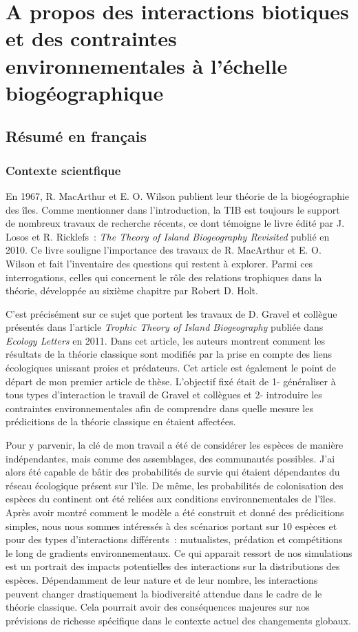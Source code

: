 \chapter{A propos des interactions biotiques et des contraintes environnementales à l'échelle biogéographique}


\section{Résumé en français}
%
\subsection{Contexte scientfique}

En 1967, R. MacArthur et E. O. Wilson publient leur théorie de la
biogéographie des îles. Comme mentionner dans l'introduction, la TIB est toujours le support de nombreux travaux de recherche récents,
ce dont témoigne le livre édité par J. Losos et R. Ricklefs~: \emph{The Theory of Island Biogeography Revisited} publié en 2010.
Ce livre souligne l'importance des travaux de R. MacArthur et E. O. Wilson et fait l'inventaire des questions qui restent à explorer.
Parmi ces interrogations, celles qui concernent le rôle des relations trophiques dans la théorie, développée au sixième chapitre par Robert D. Holt.

C'est précisément sur ce sujet que portent les travaux de D. Gravel et collègue présentés dans l'article \emph{Trophic Theory of Island Biogeography} publiée dans \emph{Ecology Letters} en 2011.
Dans cet article, les auteurs montrent comment les résultats de la théorie classique sont modifiés par la prise en compte des liens écologiques unissant proies et prédateurs.
Cet article est également le point de départ de mon premier article de thèse. L'objectif fixé était de 1- généraliser à tous types d'interaction le travail de Gravel et collègues
et 2- introduire les contraintes environnementales afin de comprendre dans quelle mesure les prédicitions de la théorie classique en étaient affectées.

Pour y parvenir, la clé de mon travail a été de considérer les espèces de manière indépendantes, mais comme des assemblages, des communautés possibles.
J'ai alors été capable de bâtir des probabilités de survie qui étaient dépendantes du réseau écologique présent sur l'île.
De même, les probabilités de colonisation des espèces du continent ont été reliées aux conditions environnementales de l'îles.
Après avoir montré comment le modèle a été construit et donné des prédicitions simples, nous nous sommes intéressés à des scénarios portant sur
10 espèces et pour des types d'interactions différents~: mutualistes, prédation et compétitions le long de gradients environnementaux.
Ce qui apparait ressort de nos simulations est un portrait des impacts potentielles des interactions sur la distributions des espèces.
Dépendamment  de leur nature et de leur nombre, les interactions peuvent changer drastiquement la biodiversité attendue dans le cadre de le théorie classique.
Cela pourrait avoir des conséquences majeures sur nos prévisions de richesse spécifique dans le contexte actuel des changements globaux.




